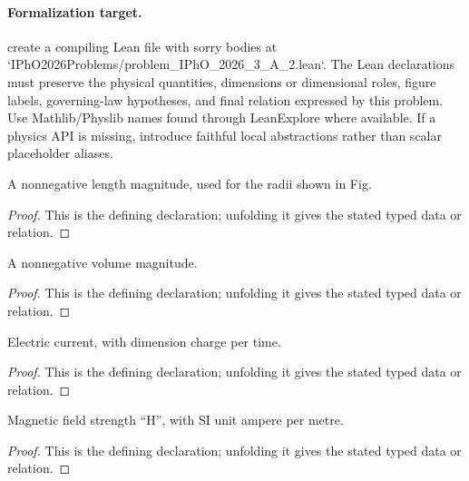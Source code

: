 \paragraph{Formalization target.}
create a compiling Lean file with sorry bodies at `IPhO2026Problems/problem\_IPhO\_2026\_3\_A\_2.lean`. The Lean declarations must preserve the physical quantities, dimensions or dimensional roles, figure labels, governing-law hypotheses, and final relation expressed by this problem.
Use Mathlib/Physlib names found through LeanExplore where available. If a physics API is missing, introduce faithful local abstractions rather than scalar placeholder aliases.

\begin{definition}[DimLengthMagnitude]
  \label{decl:physics:IPhO_2026_3_A_2:DimLengthMagnitude}
  A nonnegative length magnitude, used for the radii shown in Fig.
\end{definition}
\begin{proof}
  This is the defining declaration; unfolding it gives the stated typed data or relation.
\end{proof}

\begin{definition}[DimVolumeMagnitude]
  \label{decl:physics:IPhO_2026_3_A_2:DimVolumeMagnitude}
  A nonnegative volume magnitude.
\end{definition}
\begin{proof}
  This is the defining declaration; unfolding it gives the stated typed data or relation.
\end{proof}

\begin{definition}[DimElectricCurrent]
  \label{decl:physics:IPhO_2026_3_A_2:DimElectricCurrent}
  Electric current, with dimension charge per time.
\end{definition}
\begin{proof}
  This is the defining declaration; unfolding it gives the stated typed data or relation.
\end{proof}

\begin{definition}[DimMagneticFieldStrength]
  \label{decl:physics:IPhO_2026_3_A_2:DimMagneticFieldStrength}
  Magnetic field strength “H”, with SI unit ampere per metre.
\end{definition}
\begin{proof}
  This is the defining declaration; unfolding it gives the stated typed data or relation.
\end{proof}

